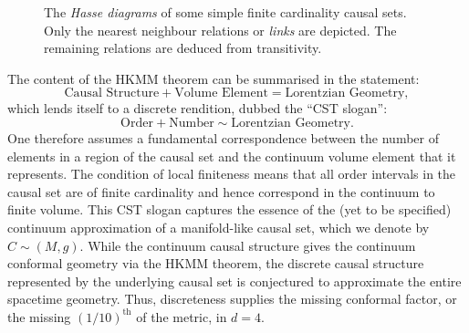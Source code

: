 \begin{figure}[ht]
\centering {}
\caption{The \emph{Hasse diagrams} of some simple finite cardinality causal sets. Only the nearest neighbour
    relations or \emph{links} are depicted. The remaining relations are deduced from transitivity.}
\label{transitivity.fig}
\end{figure}

The content of the HKMM theorem can be summarised in the statement:
\begin{equation} 
\mathrm{Causal\, \, Structure + Volume\,\, Element = Lorentzian \, \, Geometry},     
\end{equation}
which lends itself to a discrete rendition, dubbed  
the ``CST slogan'': 
\begin{equation} 
\mathrm{Order + Number \sim Lorentzian\,\, Geometry }.   
\label{ordernumber} 
\end{equation}
One  therefore assumes a fundamental correspondence between the number of elements in a region of the
  causal set and the continuum volume element that it represents. The condition of local finiteness means that all
  order intervals  in the causal set are of finite cardinality and hence correspond in the continuum to
  finite volume. This CST slogan captures  the essence of the (yet to be specified)  continuum approximation of a {manifold-like }   causal set, which we denote by $C \sim (M,g)$. 
While the continuum causal structure gives the continuum conformal geometry  via the HKMM theorem, the  discrete  causal
structure represented by the underlying causal set is conjectured to approximate  the entire spacetime geometry. Thus,  discreteness supplies the missing conformal factor, or the missing $\left(1/10\right)^{\mathrm{th}}$ of the metric, in $d=4$. 



